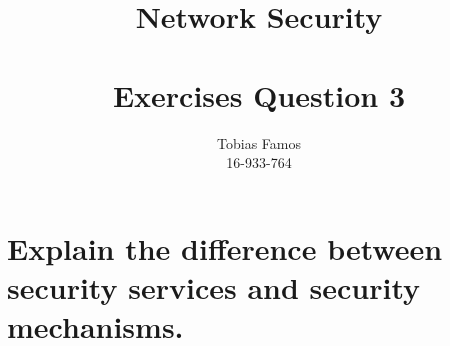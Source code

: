 \documentclass[11pt,a4paper]{article}
\title{Network Security \\ ~\\ \Large{Exercises Question 3}}
\author{Tobias Famos\\ 16-933-764}
\begin{document}
    \maketitle
    \section*{Explain the difference between security services and security mechanisms.}
\end{document}
